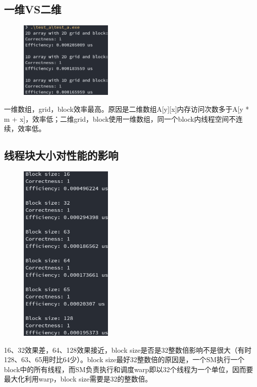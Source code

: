 \documentclass[UTF8, a4paper, 11pt]{article}
\begin{document}
\subsection{一维VS二维}
\begin{figure}[H]
    \centering
    \includegraphics[width=0.4\textwidth]{test_a.png}
\end{figure}
一维数组，grid，block效率最高。原因是二维数组A[y][x]内存访问次数多于A[y * m + x]，效率低；二维grid，block使用一维数组，同一个block内线程空间不连续，效率低。
\subsection{线程块大小对性能的影响}
\begin{figure}[H]
    \centering
    \includegraphics[width=0.4\textwidth]{test_b.png}
\end{figure}
16、32效果差，64、128效果接近，block size是否是32整数倍影响不是很大（有时128、63、65用时比64少）。block size最好32整数倍的原因是，一个SM执行一个block中的所有线程，而SM负责执行和调度warp即以32个线程为一个单位，因而要最大化利用warp，block size需要是32的整数倍。
\end{document}
